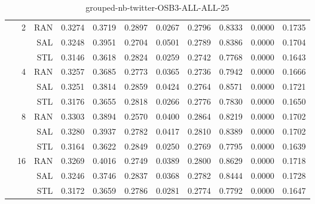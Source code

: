 \begin{center}
\begin{table}[htbp]
\begin{center}
\begin{tabular}{ | r | r | r | r | r | r | r | r | r | r | r |}
 & \multirow{3}{*}{2} & RAN & 0.3274 & 0.3719 & 0.2897 & 0.0267 & 0.2796 & 0.8333 & 0.0000 & 0.1735\\ \cline{3-11}
 &   & SAL & 0.3248 & 0.3951 & 0.2704 & 0.0501 & 0.2789 & 0.8386 & 0.0000 & 0.1704\\ \cline{3-11}
 &   & STL & 0.3146 & 0.3618 & 0.2824 & 0.0259 & 0.2742 & 0.7768 & 0.0000 & 0.1643\\ \cline{2-11}
 & \multirow{3}{*}{4} & RAN & 0.3257 & 0.3685 & 0.2773 & 0.0365 & 0.2736 & 0.7942 & 0.0000 & 0.1666\\ \cline{3-11}
 &   & SAL & 0.3251 & 0.3814 & 0.2859 & 0.0424 & 0.2764 & 0.8571 & 0.0000 & 0.1721\\ \cline{3-11}
 &   & STL & 0.3176 & 0.3655 & 0.2818 & 0.0266 & 0.2776 & 0.7830 & 0.0000 & 0.1650\\ \cline{2-11}
 & \multirow{3}{*}{8} & RAN & 0.3303 & 0.3894 & 0.2570 & 0.0400 & 0.2864 & 0.8219 & 0.0000 & 0.1702\\ \cline{3-11}
 &   & SAL & 0.3280 & 0.3937 & 0.2782 & 0.0417 & 0.2810 & 0.8389 & 0.0000 & 0.1702\\ \cline{3-11}
 &   & STL & 0.3164 & 0.3622 & 0.2849 & 0.0250 & 0.2769 & 0.7795 & 0.0000 & 0.1639\\ \cline{2-11}
 & \multirow{3}{*}{16} & RAN & 0.3269 & 0.4016 & 0.2749 & 0.0389 & 0.2800 & 0.8629 & 0.0000 & 0.1718\\ \cline{3-11}
 &   & SAL & 0.3246 & 0.3746 & 0.2837 & 0.0368 & 0.2782 & 0.8444 & 0.0000 & 0.1728\\ \cline{3-11}
 &   & STL & 0.3172 & 0.3659 & 0.2786 & 0.0281 & 0.2774 & 0.7792 & 0.0000 & 0.1647\\ \cline{2-11}
\hline
\end{tabular}
\caption{grouped-nb-twitter-OSB3-ALL-ALL-25}
\end{center}
 \end{table}
\end{center}

